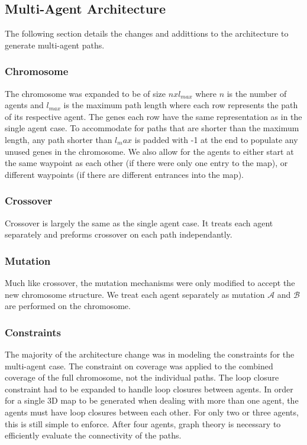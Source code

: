 \documentclass[letterpaper, 10 pt, conference]{ieeeconf}  %
\begin{document}
\subsection{Multi-Agent Architecture}

The following section details the changes and addittions to the architecture to generate multi-agent paths.

\subsubsection{Chromosome}
The chromosome was expanded to be of size $nxl_{max}$ where $n$ is the number of agents and $l_{max}$ is the maximum path length where each row represents the path of its respective agent. The genes each row have the same representation as in the single agent case. To accommodate for paths that are shorter than the maximum length, any path shorter than $l_max$ is padded with -1 at the end to populate any unused genes in the chromosome. We also allow for the agents to either start at the same waypoint as each other (if there were only one entry to the map), or different waypoints (if there are different entrances into the map).

\subsubsection{Crossover}
Crossover is largely the same as the single agent case. It treats each agent separately and preforms crossover on each path independantly.

\subsubsection{Mutation}
Much like crossover, the mutation mechanisms were only modified to accept the new chromosome structure. We treat each agent separately as mutation $\mathcal{A}$ and $\mathcal{B}$ are performed on the chromosome.

\subsubsection{Constraints}
The majority of the architecture change was in modeling the constraints for the multi-agent case. The constraint on coverage was applied to the combined coverage of the full chromosome, not the individual paths. The loop closure constraint had to be expanded to handle loop closures between agents. In order for a single 3D map to be generated when dealing with more than one agent, the agents must have loop closures between each other. For only two or three agents, this is still simple to enforce. After four agents, graph theory is necessary to efficiently evaluate the connectivity of the paths.
\end{document}

